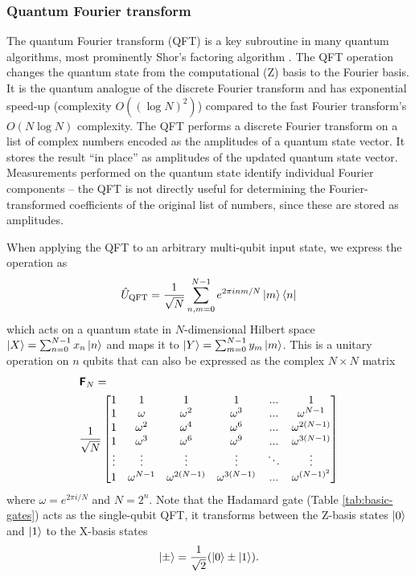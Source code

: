 \documentclass[10pt]{iopart}
\begin{document}
\subsubsection{Quantum Fourier transform}\label{sssec:QFT}\hfill

The quantum Fourier transform (QFT) is a key subroutine in many quantum algorithms, most prominently Shor's factoring algorithm \cite{Shor1994}. The QFT operation changes the quantum state from the computational (Z) basis to the Fourier basis. It is the quantum analogue of the discrete Fourier transform and has exponential speed-up (complexity $O((\log N)^2)$) compared to the fast Fourier transform's $O(N \log N)$ complexity. The QFT performs a discrete Fourier transform on a list of complex numbers encoded as the amplitudes of a quantum state vector. It stores the result ``in place'' as amplitudes of the updated quantum state vector.  Measurements performed on the quantum state identify individual Fourier components -- the QFT is not directly useful for determining the Fourier-transformed coefficients of the original list of numbers, since these are stored as amplitudes.

When applying the QFT to an arbitrary multi-qubit input state, we express the operation as
\begin{equation}
\hat{U}_\textrm{QFT} = \frac{1}{\sqrt{N}} \sum_{n,m=0}^{N-1} e^{2\pi i nm/N} \ket{m}\bra{n}
\end{equation}
which acts on a quantum state in $N$-dimensional Hilbert space $\ket{X} = \sum_{n=0}^{N-1} x_n \ket{n}$ and maps it to $\ket{Y} = \sum_{m=0}^{N-1} y_m \ket{m}$. 
This is a unitary operation on $n$ qubits that can also be expressed as the complex $N \times N$ matrix
\begin{align}
&\textsf{\textbf{F}}_N = \nonumber\\
&\frac{1}{\sqrt{N}} \begin{bmatrix}
1 & 1 & 1 & 1 & ... & 1 \\
1 & \omega & \omega^2 & \omega^3 & ... & \omega^{N-1} \\
1 & \omega^2 & \omega^4 & \omega^6 & ... & \omega^{2(N-1)} \\
1 & \omega^3 & \omega^6 & \omega^9 & ... & \omega^{3(N-1)} \\
\vdots & \vdots & \vdots & \vdots & \ddots & \vdots \\
1 & \omega^{N-1} & \omega^{2(N-1)} & \omega^{3(N-1)} & ... & \omega^{(N-1)^2}
\end{bmatrix} \label{eq:qft-matrix}
\end{align}
where $\omega=e^{2\pi i/N}$ and $N=2^n$.
Note that the Hadamard gate (Table \ref{tab:basic-gates}) acts as the single-qubit QFT, it transforms between the Z-basis states $\ket{0}$ and $\ket{1}$ to the X-basis states 
\begin{equation}
\ket{\pm} = \frac{1}{\sqrt{2}} (\ket{0} \pm \ket{1}).
\end{equation}
\end{document}
